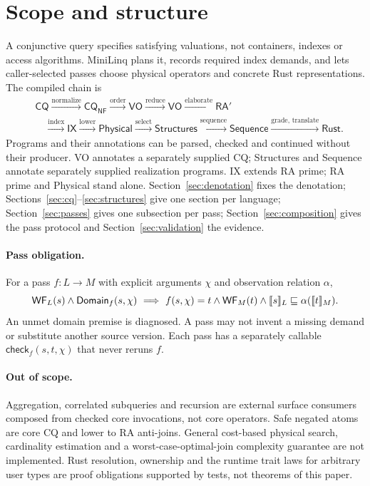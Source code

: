 \section{Scope and structure}
\label{sec:introduction}
A conjunctive query specifies satisfying valuations, not containers, indexes
or access algorithms. MiniLinq plans it, records required index demands, and
lets caller-selected passes choose physical operators and concrete Rust
representations. The compiled chain is
\[
\begin{aligned}
 &\mathsf{CQ}\xrightarrow{\text{normalize}}\mathsf{CQ_{NF}}
 \xrightarrow{\text{order}}\mathsf{VO}\xrightarrow{\text{reduce}}\mathsf{VO}
 \xrightarrow{\text{elaborate}}\mathsf{RA'}\\
 &\quad\xrightarrow{\text{index}}\mathsf{IX}
 \xrightarrow{\text{lower}}\mathsf{Physical}
 \xrightarrow{\text{select}}\mathsf{Structures}
 \xrightarrow{\text{sequence}}\mathsf{Sequence}
 \xrightarrow{\text{grade, translate}}\mathsf{Rust}.
\end{aligned}
\]
Programs and their annotations can be parsed, checked and continued without
their producer. VO annotates a separately supplied CQ; Structures and Sequence
annotate separately supplied realization programs. IX extends RA prime;
RA prime and Physical stand alone. Section~\ref{sec:denotation} fixes the denotation;
Sections~\ref{sec:cq}--\ref{sec:structures} give one section per language;
Section~\ref{sec:passes} gives one subsection per pass;
Section~\ref{sec:composition} gives the pass protocol and
Section~\ref{sec:validation} the evidence.

\paragraph{Pass obligation.} For a pass $f:L\to M$ with explicit arguments
$\chi$ and observation relation $\alpha$,
\[
 \mathsf{WF}_L(s)\land\mathsf{Domain}_f(s,\chi)
 \ \Longrightarrow\
 f(s,\chi)=t\land\mathsf{WF}_M(t)\land\llbracket s\rrbracket_L\sqsubseteq\alpha(\llbracket t\rrbracket_M).
\]
An unmet domain premise is diagnosed. A pass may not invent a missing demand
or substitute another source version. Each pass has a separately callable
$\mathsf{check}_f(s,t,\chi)$ that never reruns $f$.

\paragraph{Out of scope.} Aggregation, correlated subqueries and recursion
are external surface consumers composed from checked core invocations, not
core operators. Safe negated atoms are core CQ and lower to RA anti-joins.
General cost-based physical search,
cardinality estimation and a worst-case-optimal-join complexity guarantee are
not implemented. Rust resolution, ownership and the runtime trait laws for
arbitrary user types are proof obligations supported by tests, not theorems
of this paper.

